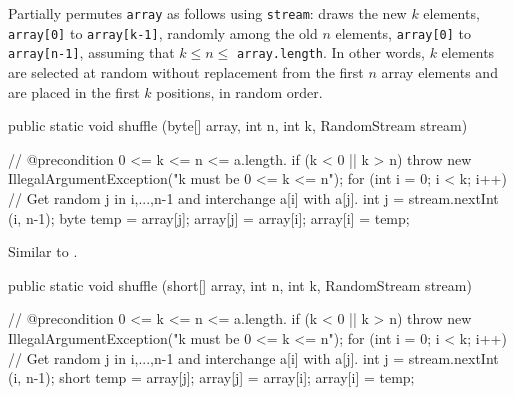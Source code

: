 \begin{tabb}  Partially permutes \texttt{array} as follows
 using \texttt{stream}: draws the new $k$ elements, \texttt{array[0]} to
 \texttt{array[k-1]}, randomly among the old $n$  elements, \texttt{array[0]}
 to \texttt{array[n-1]}, assuming that $k \le n \le$ \texttt{array.length}.
 In other words, $k$ elements are selected at random without replacement
 from the first $n$ array elements and are placed in the first 
 $k$ positions, in random order.
\end{tabb}
\begin{htmlonly}
\end{htmlonly}
\begin{code}

   public static void shuffle (byte[] array, int n, int k,
                               RandomStream stream)\begin{hide} {
      // @precondition 0 <= k <= n <= a.length.
      if (k < 0 || k > n)
         throw new IllegalArgumentException("k must be   0 <= k <= n");
      for (int i = 0; i < k; i++) {
         // Get random j in {i,...,n-1} and interchange a[i] with a[j].
         int j = stream.nextInt (i, n-1);
         byte temp = array[j];
         array[j] = array[i];
         array[i] = temp;
      }
   }\end{hide}
\end{code}
\begin{tabb} Similar to 
 .
\end{tabb}
\begin{htmlonly}
\end{htmlonly}
\begin{code}

   public static void shuffle (short[] array, int n, int k,
                               RandomStream stream)\begin{hide} {
      // @precondition 0 <= k <= n <= a.length.
      if (k < 0 || k > n)
         throw new IllegalArgumentException("k must be   0 <= k <= n");
      for (int i = 0; i < k; i++) {
         // Get random j in {i,...,n-1} and interchange a[i] with a[j].
         int j = stream.nextInt (i, n-1);
         short temp = array[j];
         array[j] = array[i];
         array[i] = temp;
      }
   }\end{hide}
\end{code}

